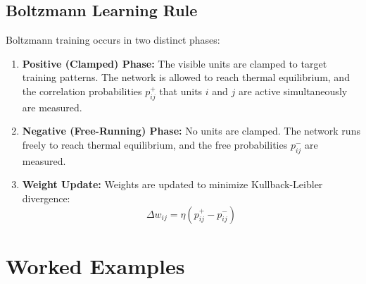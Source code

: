 \documentclass[12pt,a4paper]{article}
\begin{document}
\subsection{Boltzmann Learning Rule}
Boltzmann training occurs in two distinct phases:
\begin{enumerate}[leftmargin=*, itemsep=3.5pt]
  \item \textbf{Positive (Clamped) Phase:} The visible units are clamped to target training patterns. The network is allowed to reach thermal equilibrium, and the correlation probabilities $p_{ij}^+$ that units $i$ and $j$ are active simultaneously are measured.
  \item \textbf{Negative (Free-Running) Phase:} No units are clamped. The network runs freely to reach thermal equilibrium, and the free probabilities $p_{ij}^-$ are measured.
  \item \textbf{Weight Update:} Weights are updated to minimize Kullback-Leibler divergence:
    \begin{equation}
      \Delta w_{ij} = \eta (p_{ij}^+ - p_{ij}^-)
    \end{equation}
\end{enumerate}

\section{Worked Examples}
\end{document}
